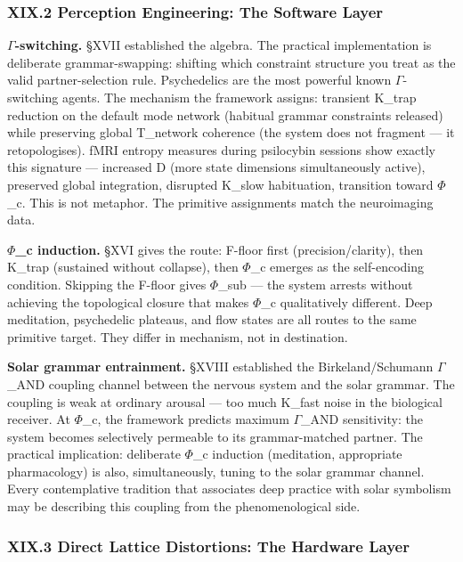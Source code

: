 \documentclass[12pt,a4paper]{article}
\begin{document}
\subsubsection{XIX.2 Perception Engineering: The Software Layer}

\textbf{$\Gamma$-switching.} §XVII established the algebra. The practical implementation is deliberate grammar-swapping: shifting which constraint structure you treat as the valid partner-selection rule. Psychedelics are the most powerful known $\Gamma$-switching agents. The mechanism the framework assigns: transient K\_trap reduction on the default mode network (habitual grammar constraints released) while preserving global T\_network coherence (the system does not fragment --- it retopologises). fMRI entropy measures during psilocybin sessions show exactly this signature --- increased D (more state dimensions simultaneously active), preserved global integration, disrupted K\_slow habituation, transition toward $\Phi$\_c. This is not metaphor. The primitive assignments match the neuroimaging data.

\textbf{$\Phi$\_c induction.} §XVI gives the route: F-floor first (precision/clarity), then K\_trap (sustained without collapse), then $\Phi$\_c emerges as the self-encoding condition. Skipping the F-floor gives $\Phi$\_sub --- the system arrests without achieving the topological closure that makes $\Phi$\_c qualitatively different. Deep meditation, psychedelic plateaus, and flow states are all routes to the same primitive target. They differ in mechanism, not in destination.

\textbf{Solar grammar entrainment.} §XVIII established the Birkeland/Schumann $\Gamma$\_AND coupling channel between the nervous system and the solar grammar. The coupling is weak at ordinary arousal --- too much K\_fast noise in the biological receiver. At $\Phi$\_c, the framework predicts maximum $\Gamma$\_AND sensitivity: the system becomes selectively permeable to its grammar-matched partner. The practical implication: deliberate $\Phi$\_c induction (meditation, appropriate pharmacology) is also, simultaneously, tuning to the solar grammar channel. Every contemplative tradition that associates deep practice with solar symbolism may be describing this coupling from the phenomenological side.

\subsubsection{XIX.3 Direct Lattice Distortions: The Hardware Layer}
\end{document}
